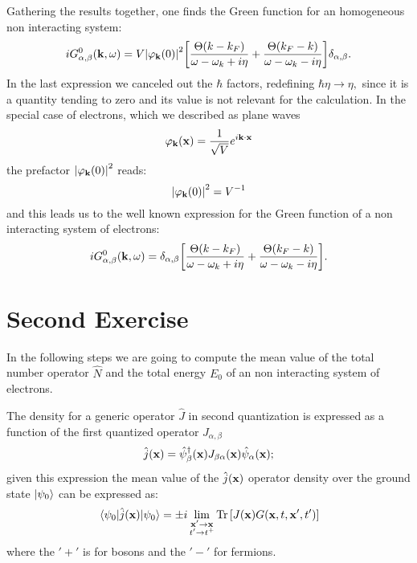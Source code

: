 \documentclass[a4paper]{article}
\begin{document}
Gathering the results together, one finds the Green function for an homogeneous non interacting system:
\begin{equation}
iG_{\alpha,\beta}^0(\vb{k},\omega) =  V \abs{\varphi_{\vb{k}}(0) }^2  \bqty{\frac{\Theta\pqty{k-k_F}}{\omega - \omega_k + i\eta} + \frac{\Theta\pqty{k_F-k}}{\omega - \omega_k - i\eta}   } \delta_{\alpha,\beta}.
\end{equation}
In the last expression we canceled out the $\hbar$ factors, redefining $\hbar\eta\rightarrow\eta,$ since it is a quantity tending to zero and its value is not relevant for the calculation.
In the special case of electrons, which we described as plane waves
\begin{equation}
\varphi_{\vb{k}}(\vb{x}) = \frac{1}{\sqrt{V}}e^{i \vb{k}\cdot\vb{x}}
\end{equation}
the prefactor $\abs{\varphi_{\vb{k}}(0) }^2 $ reads:
\begin{equation}
\abs{\varphi_{\vb{k}}(0) }^2 = V^{-1}
\end{equation}
and this leads us to the well known expression for the Green function of a non interacting system of electrons:
\begin{equation}
iG_{\alpha,\beta}^0(\vb{k},\omega) = \delta_{\alpha,\beta} \bqty{\frac{\Theta\pqty{k-k_F}}{\omega - \omega_k + i\eta} + \frac{\Theta\pqty{k_F-k}}{\omega - \omega_k - i\eta}   } .
\end{equation}








\newpage
\section{Second Exercise}

\noindent In the following steps we are going to compute the mean value of the total number operator $\hat{N}$ and the total energy $E_0$ of an non interacting system of electrons.
\medskip

The density for a generic operator $\hat{J} $ in second quantization is expressed as a function of the first quantized operator $J_{\alpha,\beta}$
\begin{equation}
\hat{j}(\vb{x}) = \hat{\psi}^\dag_\beta(\vb{x}) J_{\beta\alpha}(\vb{x})\hat{\psi}_\alpha(\vb{x});
\end{equation}
given this expression the mean value of the $\hat{j}(\vb{x})$ operator density over the ground state $\ket{\psi_0}$ can be expressed as:
\begin{equation}
\mel{\psi_0}{\hat{j}(\vb{x})}{\psi_0} = \pm i \lim_{\substack{\vb{x}'\rightarrow \vb{x}\\t'\rightarrow t^+}} \Tr\bqty{J(\vb{x})G(\vb{x},t,\vb{x}',t')} \label{eq:meanvalue}
\end{equation}
where the $'+'$ is for bosons and the $'-'$ for fermions.
\end{document}
